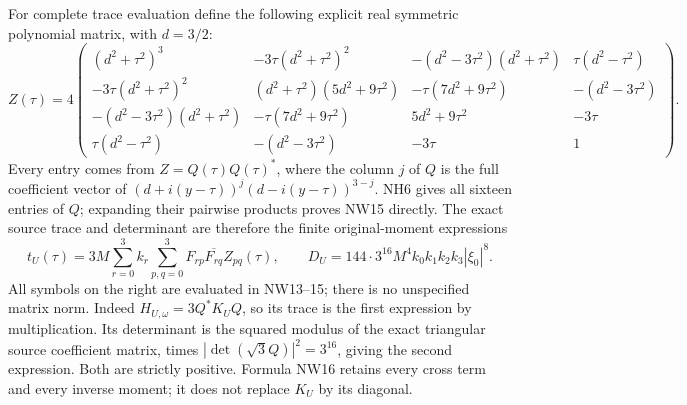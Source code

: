 \documentclass[11pt]{article}
\begin{document}
For complete trace evaluation define the following explicit
real symmetric polynomial matrix, with $d=3/2$:
\[
 Z(\tau)=4\begin{pmatrix}
 (d^2+\tau^2)^3&-3\tau(d^2+\tau^2)^2&-(d^2-3\tau^2)(d^2+\tau^2)&\tau(d^2-\tau^2)\\
 -3\tau(d^2+\tau^2)^2&(d^2+\tau^2)(5d^2+9\tau^2)&-\tau(7d^2+9\tau^2)&-(d^2-3\tau^2)\\
 -(d^2-3\tau^2)(d^2+\tau^2)&-\tau(7d^2+9\tau^2)&5d^2+9\tau^2&-3\tau\\
 \tau(d^2-\tau^2)&-(d^2-3\tau^2)&-3\tau&1
 \end{pmatrix}.
 \tag{NW15}
\]
Every entry comes from $Z=Q(\tau)Q(\tau)^*$, where the
column $j$ of $Q$ is the full coefficient vector of
$(d+i(y-\tau))^j(d-i(y-\tau))^{3-j}$. NH6 gives all
sixteen entries of $Q$; expanding their pairwise products
proves NW15 directly. The exact source trace and determinant
are therefore the finite original-moment expressions
\[
 \boxed{\quad t_U(\tau)=3M\sum_{r=0}^3k_r
               \sum_{p,q=0}^3F_{rp}\overline{F_{rq}}Z_{pq}(\tau),
 \qquad
 D_U=144\cdot3^{16}M^4k_0k_1k_2k_3|\xi_0|^8.\quad}
 \tag{NW16}
\]
All symbols on the right are evaluated in NW13--15;
there is no unspecified matrix norm. Indeed
$H_{U,\omega}=3Q^*K_UQ$, so its trace is the first
expression by multiplication. Its determinant is the
squared modulus of the exact triangular source coefficient
matrix, times $|\det(\sqrt3Q)|^2=3^{16}$, giving the
second expression. Both are strictly positive. Formula
NW16 retains every cross term and every inverse moment;
it does not replace $K_U$ by its diagonal.
\end{document}
